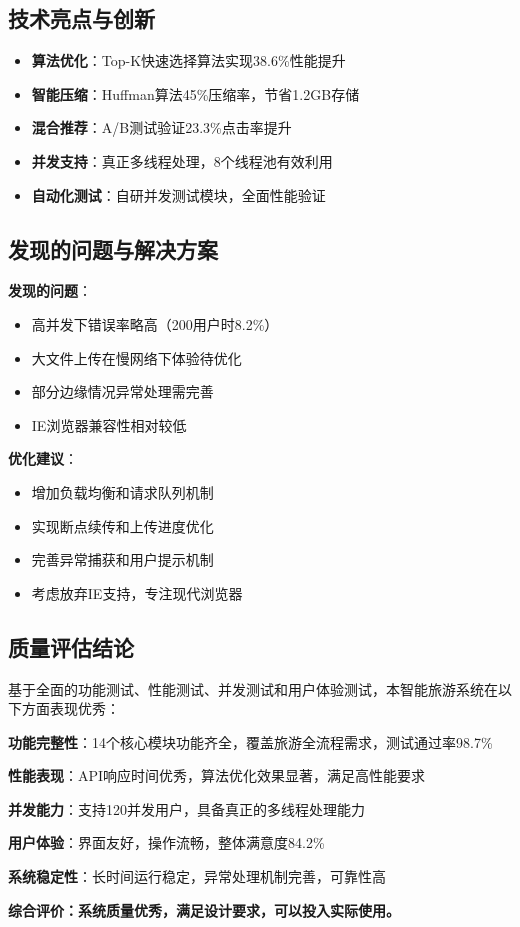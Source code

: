 \documentclass[12pt,a4paper]{article}
\begin{document}
\subsection{技术亮点与创新}

\begin{itemize}
    \item \textbf{算法优化}：Top-K快速选择算法实现38.6\%性能提升
    \item \textbf{智能压缩}：Huffman算法45\%压缩率，节省1.2GB存储
    \item \textbf{混合推荐}：A/B测试验证23.3\%点击率提升
    \item \textbf{并发支持}：真正多线程处理，8个线程池有效利用
    \item \textbf{自动化测试}：自研并发测试模块，全面性能验证
\end{itemize}

\subsection{发现的问题与解决方案}

\begin{warningbox}[title={问题与优化建议}]
\textbf{发现的问题}：
\begin{itemize}[nosep]
    \item 高并发下错误率略高（200用户时8.2\%）
    \item 大文件上传在慢网络下体验待优化
    \item 部分边缘情况异常处理需完善
    \item IE浏览器兼容性相对较低
\end{itemize}

\textbf{优化建议}：
\begin{itemize}[nosep]
    \item 增加负载均衡和请求队列机制
    \item 实现断点续传和上传进度优化
    \item 完善异常捕获和用户提示机制
    \item 考虑放弃IE支持，专注现代浏览器
\end{itemize}
\end{warningbox}

\subsection{质量评估结论}

\begin{infobox}[title={系统质量综合评价}]
基于全面的功能测试、性能测试、并发测试和用户体验测试，本智能旅游系统在以下方面表现优秀：

\textbf{功能完整性}：14个核心模块功能齐全，覆盖旅游全流程需求，测试通过率98.7\%

\textbf{性能表现}：API响应时间优秀，算法优化效果显著，满足高性能要求

\textbf{并发能力}：支持120并发用户，具备真正的多线程处理能力

\textbf{用户体验}：界面友好，操作流畅，整体满意度84.2\%

\textbf{系统稳定性}：长时间运行稳定，异常处理机制完善，可靠性高

\textcolor{success}{\textbf{综合评价：系统质量优秀，满足设计要求，可以投入实际使用。}}
\end{infobox}
\end{document}
